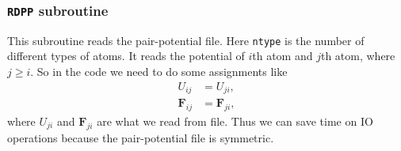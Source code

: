 
\subsubsection{\texttt{RDPP} subroutine}

This subroutine reads the pair-potential file.
Here \texttt{ntype} is the number of different types of atoms.
It reads the potential of $i$th atom and $j$th atom, where $j \geq i$.
So in the code we need to do some assignments like
\begin{align}
	U_{ij}      & = U_{ji},      \\
	\bm{F}_{ij} & = \bm{F}_{ji},
\end{align}
where $U_{ji}$ and $\bm{F}_{ji}$ are what we read from file.
Thus we can save time on IO operations because the pair-potential
file is symmetric.
